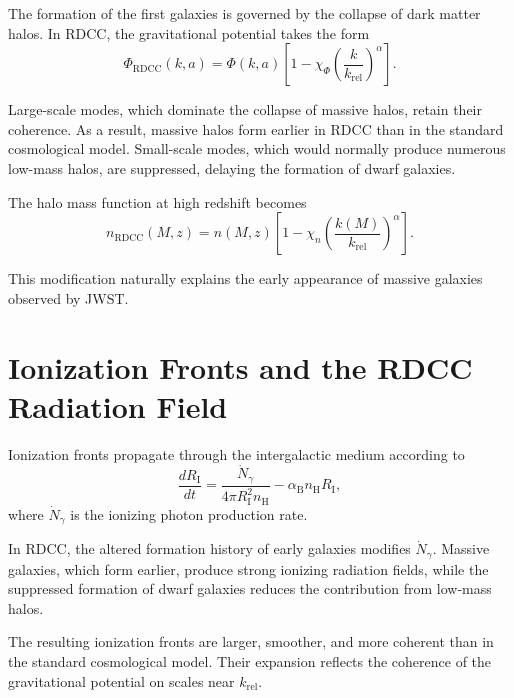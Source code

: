 \documentclass[11pt,a4paper]{article}
\begin{document}
The formation of the first galaxies is governed by the collapse of dark matter 
halos. In RDCC, the gravitational potential takes the form
\begin{equation}
    \Phi_{\mathrm{RDCC}}(k,a)
    = \Phi(k,a)
      \left[
        1 - \chi_{\Phi}
        \left(\frac{k}{k_{\mathrm{rel}}}\right)^{\alpha}
      \right].
\end{equation}

Large-scale modes, which dominate the collapse of massive halos, retain their 
coherence. As a result, massive halos form earlier in RDCC than in the standard 
cosmological model. Small-scale modes, which would normally produce numerous 
low-mass halos, are suppressed, delaying the formation of dwarf galaxies.

The halo mass function at high redshift becomes
\begin{equation}
    n_{\mathrm{RDCC}}(M,z)
    = n(M,z)
      \left[
        1 - \chi_{n}
        \left(\frac{k(M)}{k_{\mathrm{rel}}}\right)^{\alpha}
      \right].
\end{equation}

This modification naturally explains the early appearance of massive galaxies 
observed by JWST.
\section{Ionization Fronts and the RDCC Radiation Field}

Ionization fronts propagate through the intergalactic medium according to
\begin{equation}
    \frac{dR_{\mathrm{I}}}{dt}
    = \frac{\dot{N}_{\gamma}}{4\pi R_{\mathrm{I}}^{2} n_{\mathrm{H}}}
      - \alpha_{\mathrm{B}} n_{\mathrm{H}} R_{\mathrm{I}},
\end{equation}
where $\dot{N}_{\gamma}$ is the ionizing photon production rate.

In RDCC, the altered formation history of early galaxies modifies $\dot{N}_{\gamma}$. 
Massive galaxies, which form earlier, produce strong ionizing radiation fields, 
while the suppressed formation of dwarf galaxies reduces the contribution from 
low-mass halos.

The resulting ionization fronts are larger, smoother, and more coherent than in the 
standard cosmological model. Their expansion reflects the coherence of the 
gravitational potential on scales near $k_{\mathrm{rel}}$.
\end{document}
